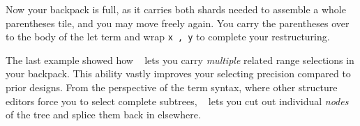 


Now your backpack is full, as it carries both shards
needed to assemble a whole parentheses tile,
and you may move freely again.
You carry the parentheses over to the body of the
let term and wrap \texttt{x , y} to complete your
restructuring.

The last example showed how \tylr~ lets you carry \emph{multiple}
related range selections in your backpack.
This ability vastly improves your selecting precision
compared to prior designs.
From the perspective of the term syntax,
where other structure editors force you to select
complete subtrees, \tylr~ lets you cut out individual
\emph{nodes} of the tree and splice them back in
elsewhere.



